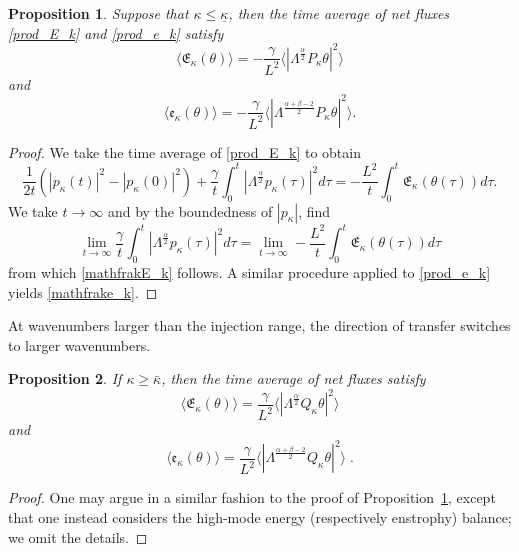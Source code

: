 \documentclass[twoside, reqno]{amsart}
\numberwithin{lemma}{section}
\numberwithin{theorem}{section}
\newtheorem{proposition}{Proposition}
\numberwithin{proposition}{section}
\numberwithin{equation}{section} %
\newcommand{\te}{\theta}
\newcommand{\ga}{\gamma}
\newcommand{\la}{\Lambda}
\newcommand{\ka}{\kappa}
\newcommand{\E}{\mathfrak{E}}
\newcommand{\bkap}{\bar{\kap}}
\newcommand{\kapb}{\underline{\kap}}
\newcommand{\kap}{\kappa}
\begin{document}
\begin{proposition} \label{def:mathfraks}
    Suppose that $\kappa \leq {\kapb}$, then the time average of net fluxes \eqref{prod_E_k} and \eqref{prod_e_k} satisfy
    \begin{equation} \label{mathfrakE_k}
        \langle\E_{\kappa}(\te)\rangle = -\frac{\ga}{L^2} \langle|\la^{\frac{\alpha}{2}} P_{\kappa}\te|^2\rangle
    \end{equation}
    and
    \begin{equation} \label{mathfrake_k}
        \langle\mathfrak{e}_{\kappa}(\te)\rangle = -\frac{\ga}{L^2} \langle|\la^{\frac{\alpha+\beta-2}{2}} P_{\kappa}\te|^2\rangle .
    \end{equation}
\end{proposition}
\begin{proof}
We take the time average of \eqref{prod_E_k} to obtain
    \begin{equation*}
        \frac{1}{2t} (|p_{\kappa}(t)|^2 - |p_{\kappa}(0)|^2) + \frac{\ga}{t} \int_0^t |\la^{\frac{\alpha}{2}} p_{\kappa}(\tau)|^2 d\tau = -\frac{L^2}{t} \int_0^t \mathfrak{E}_{\ka}(\te(\tau))d\tau .
    \end{equation*}
    We take $t \to \infty$ and by the boundedness of ${|p_\ka|}$, find
    \begin{equation*}
        \lim_{t\to \infty} \frac{\ga}{t} \int_0^t |\la^{\frac{\alpha}{2}} p_{\kappa}(\tau)|^2 d\tau = \lim_{t\to \infty} -\frac{L^2}{t} \int_0^t \mathfrak{E}_{\ka}(\te(\tau))d\tau
    \end{equation*}
    from which \eqref{mathfrakE_k} follows.
    A similar procedure applied to  \eqref{prod_e_k} yields \eqref{mathfrake_k}.
\end{proof}
At wavenumbers larger than the injection range, the {direction of transfer switches} to larger wavenumbers.
\begin{proposition}\label{directflux}
    If $\kappa \geq \bkap$, then the time average of net fluxes satisfy
    \begin{equation*}
        \langle\E_{\kappa}(\te)\rangle = \frac{\ga}{L^2} \langle|\la^{\frac{\alpha}{2}} Q_{\kappa}\te|^2\rangle
    \end{equation*}
    and
    \begin{equation*}
        \langle\mathfrak{e}_{\kappa}(\te)\rangle = \frac{\ga}{L^2} \langle|\la^{\frac{\alpha+\beta-2}{2}} Q_{\kappa}\te|^2\rangle \;.
    \end{equation*}
\end{proposition}
\begin{proof}
    {One may argue in a similar fashion to the proof of Proposition~\ref{def:mathfraks}, except that one instead considers the high-mode energy (respectively enstrophy) balance; we omit the details.}
\end{proof}
\end{document}

